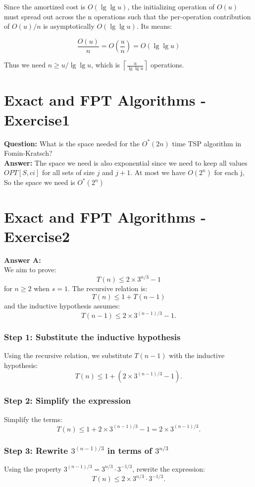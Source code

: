 \documentclass[12pt]{article}
\begin{document}
Since the amortized cost is $O(\lg \lg u)$, the initializing operation of $O(u)$ must spread out across  the n operations such that the per-operation contribution of $O(u)/n$ is asymptotically $O(\lg \lg u)$. Its means:

\begin{equation}
\frac{O(u)}{n}=O(\frac{u}{n}) = O( \lg \lg u)
\end{equation}

Thus we need $n \ge u/ \lg \lg u$, which is $\displaystyle \left \lceil \frac{u}{\lg\lg u} \right \rceil$ operations.


\section{Exact and FPT Algorithms - Exercise1}
\textbf{Question:} What is the space needed for the \(O^*(2n)\) time TSP algorithm in Fomin-Kratsch?\\
\textbf{Answer:} The space we need is also exponential since we need to keep all values \(OPT[S,ci]\) for all sets of size \(j\) and \(j+1\). At most we have \(O(2^n)\) for each j, So the space we need is \(O^*(2^n)\)


\section{Exact and FPT Algorithms - Exercise2}
\textbf{Answer A: }\\
We aim to prove:
\[
T(n) \leq 2 \times 3^{n/3} - 1
\]
for \( n \geq 2 \) when \( s = 1 \). The recursive relation is:
\[
T(n) \leq 1 + T(n-1)
\]
and the inductive hypothesis assumes:
\[
T(n-1) \leq 2 \times 3^{(n-1)/3} - 1.
\]

\subsubsection*{Step 1: Substitute the inductive hypothesis}
Using the recursive relation, we substitute \( T(n-1) \) with the inductive hypothesis:
\[
T(n) \leq 1 + \left( 2 \times 3^{(n-1)/3} - 1 \right).
\]

\subsubsection*{Step 2: Simplify the expression}
Simplify the terms:
\[
T(n) \leq 1 + 2 \times 3^{(n-1)/3} - 1 = 2 \times 3^{(n-1)/3}.
\]

\subsubsection*{Step 3: Rewrite \( 3^{(n-1)/3} \) in terms of \( 3^{n/3} \)}
Using the property \( 3^{(n-1)/3} = 3^{n/3} \cdot 3^{-1/3} \), rewrite the expression:
\[
T(n) \leq 2 \times 3^{n/3} \cdot 3^{-1/3}.
\]
\end{document}
